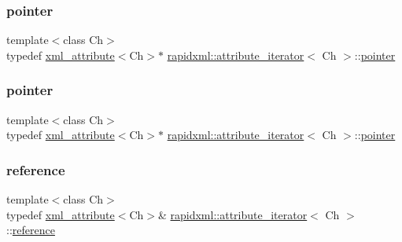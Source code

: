 \subsubsection{\texorpdfstring{pointer}{pointer}\hspace{0.1cm}{\footnotesize\ttfamily [1/2]}}
{\footnotesize\ttfamily template$<$class Ch$>$ \\
typedef \mbox{\hyperlink{classrapidxml_1_1xml__attribute}{xml\+\_\+attribute}}$<$Ch$>$$\ast$ \mbox{\hyperlink{classrapidxml_1_1attribute__iterator}{rapidxml\+::attribute\+\_\+iterator}}$<$ Ch $>$\+::\mbox{\hyperlink{classrapidxml_1_1attribute__iterator_a69acc2e60270d6a062c03c9cb1cf2aa7}{pointer}}}

\mbox{\label{classrapidxml_1_1attribute__iterator_a69acc2e60270d6a062c03c9cb1cf2aa7}} 
\subsubsection{\texorpdfstring{pointer}{pointer}\hspace{0.1cm}{\footnotesize\ttfamily [2/2]}}
{\footnotesize\ttfamily template$<$class Ch$>$ \\
typedef \mbox{\hyperlink{classrapidxml_1_1xml__attribute}{xml\+\_\+attribute}}$<$Ch$>$$\ast$ \mbox{\hyperlink{classrapidxml_1_1attribute__iterator}{rapidxml\+::attribute\+\_\+iterator}}$<$ Ch $>$\+::\mbox{\hyperlink{classrapidxml_1_1attribute__iterator_a69acc2e60270d6a062c03c9cb1cf2aa7}{pointer}}}

\mbox{\label{classrapidxml_1_1attribute__iterator_a097343e44557de14de86b470d3f917d9}} 
\subsubsection{\texorpdfstring{reference}{reference}\hspace{0.1cm}{\footnotesize\ttfamily [1/2]}}
{\footnotesize\ttfamily template$<$class Ch$>$ \\
typedef \mbox{\hyperlink{classrapidxml_1_1xml__attribute}{xml\+\_\+attribute}}$<$Ch$>$\& \mbox{\hyperlink{classrapidxml_1_1attribute__iterator}{rapidxml\+::attribute\+\_\+iterator}}$<$ Ch $>$\+::\mbox{\hyperlink{classrapidxml_1_1attribute__iterator_a097343e44557de14de86b470d3f917d9}{reference}}}

